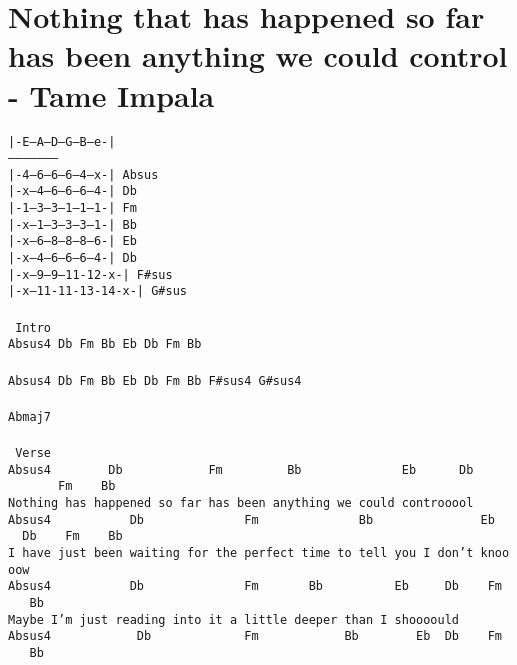 \newpage
\section{Nothing that has happened so far has been anything we could control - Tame Impala}
\label{Nothing that has happened so far has been anything we could control - Tame Impala}
\texttt{|-E--A--D--G--B--e-|\\
--------------------\\
|-4--6--6--6--4--x-|\ Absus\\
|-x--4--6--6--6--4-|\ Db\\
|-1--3--3--1--1--1-|\ Fm\\
|-x--1--3--3--3--1-|\ Bb\\
|-x--6--8--8--8--6-|\ Eb\\
|-x--4--6--6--6--4-|\ Db\\
|-x--9--9--11-12-x-|\ F\#sus\\
|-x--11-11-13-14-x-|\ G\#sus\\
\\
\lbrack\ Intro\rbrack\ \\
Absus4\ Db\ Fm\ Bb\ Eb\ Db\ Fm\ Bb\ \\
\\
Absus4\ Db\ Fm\ Bb\ Eb\ Db\ Fm\ Bb\ F\#sus4\ G\#sus4\\
\\
Abmaj7\\
\\
\lbrack\ Verse\rbrack\\
Absus4\ \ \ \ \ \ \ \ Db\ \ \ \ \ \ \ \ \ \ \ \ Fm\ \ \ \ \ \ \ \ \ Bb\ \ \ \ \ \ \ \ \ \ \ \ \ \ Eb\ \ \ \ \ \ Db\ \ \ \ \ \ \ \ \ \ \ \ Fm\ \ \ \ Bb\\
Nothing\ has\ happened\ so\ far\ has\ been\ anything\ we\ could\ controoool\\
Absus4\ \ \ \ \ \ \ \ \ \ \ Db\ \ \ \ \ \ \ \ \ \ \ \ \ \ Fm\ \ \ \ \ \ \ \ \ \ \ \ \ \ Bb\ \ \ \ \ \ \ \ \ \ \ \ \ \ \ Eb\ \ \ \ Db\ \ \ \ Fm\ \ \ \ Bb\\
I\ have\ just\ been\ waiting\ for\ the\ perfect\ time\ to\ tell\ you\ I\ don't\ knoooow\\
Absus4\ \ \ \ \ \ \ \ \ \ \ Db\ \ \ \ \ \ \ \ \ \ \ \ \ \ Fm\ \ \ \ \ \ \ Bb\ \ \ \ \ \ \ \ \ \ Eb\ \ \ \ \ Db\ \ \ \ Fm\ \ \ \ Bb\\
Maybe\ I'm\ just\ reading\ into\ it\ a\ little\ deeper\ than\ I\ shoooould\\
Absus4\ \ \ \ \ \ \ \ \ \ \ \ Db\ \ \ \ \ \ \ \ \ \ \ \ \ Fm\ \ \ \ \ \ \ \ \ \ \ \ Bb\ \ \ \ \ \ \ \ Eb\ \ Db\ \ \ \ Fm\ \ \ \ Bb\\
}
